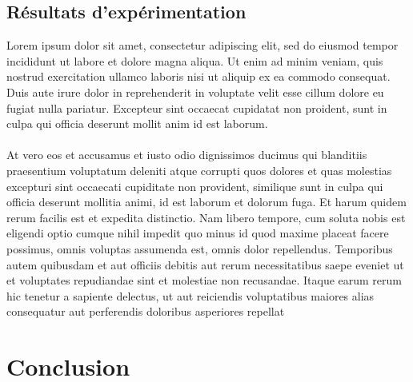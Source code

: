 \documentclass[12pt,a4paper,twoside]{report}
\begin{document}
		\section{Résultats d'expérimentation}
			Lorem ipsum dolor sit amet, consectetur adipiscing elit, sed do eiusmod tempor incididunt ut labore et dolore magna aliqua. Ut enim ad minim veniam, quis nostrud exercitation ullamco laboris nisi ut aliquip ex ea commodo consequat. Duis aute irure dolor in reprehenderit in voluptate velit esse cillum dolore eu fugiat nulla pariatur. Excepteur sint occaecat cupidatat non proident, sunt in culpa qui officia deserunt mollit anim id est laborum. 
			\\ \\
			At vero eos et accusamus et iusto odio dignissimos ducimus qui blanditiis praesentium voluptatum deleniti atque corrupti quos dolores et quas molestias excepturi sint occaecati cupiditate non provident, similique sunt in culpa qui officia deserunt mollitia animi, id est laborum et dolorum fuga. Et harum quidem rerum facilis est et expedita distinctio. Nam libero tempore, cum soluta nobis est eligendi optio cumque nihil impedit quo minus id quod maxime placeat facere possimus, omnis voluptas assumenda est, omnis dolor repellendus. Temporibus autem quibusdam et aut officiis debitis aut rerum necessitatibus saepe eveniet ut et voluptates repudiandae sint et molestiae non recusandae. Itaque earum rerum hic tenetur a sapiente delectus, ut aut reiciendis voluptatibus maiores alias consequatur aut perferendis doloribus asperiores repellat
			 
		
	
	\chapter{Conclusion}
\end{document}
